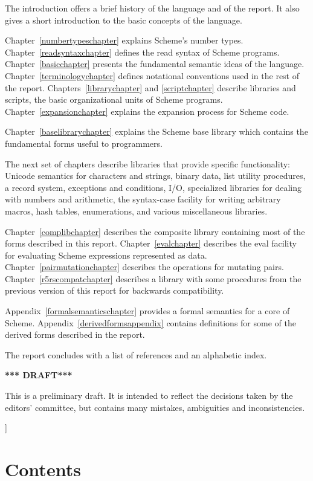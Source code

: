 {The introduction offers a brief history of the language and of
the report.  It also gives a short introduction to the basic concepts
of the language.

Chapter~\ref{numbertypeschapter} explains Scheme's number types.
Chapter~\ref{readsyntaxchapter} defines the read syntax of Scheme
programs.  Chapter~\ref{basicchapter} presents the fundamental
semantic ideas of the language.  Chapter~\ref{terminologychapter}
defines notational conventions used in the rest of the report.
Chapters~\ref{librarychapter} and \ref{scriptchapter} describe
libraries and scripts, the basic organizational units of Scheme
programs.  Chapter~\ref{expansionchapter} explains the expansion
process for Scheme code.

Chapter~\ref{baselibrarychapter} explains the Scheme base library which
contains the fundamental forms useful to programmers.

The next set of chapters describe libraries that provide specific
functionality:
Unicode semantics for characters and strings,
binary data,
list utility procedures,
a record system,
exceptions and conditions,
I/O,
specialized libraries for dealing with numbers and arithmetic,
the {\cf syntax-case} facility for writing arbitrary macros,
hash tables,
enumerations,
and various miscellaneous libraries.

Chapter~\ref{complibchapter} describes the composite library
containing most of the forms described in this report.
Chapter~\ref{evalchapter} describes the {\cf eval} facility for
evaluating Scheme expressions represented as data.
Chapter~\ref{pairmutationchapter} describes the operations for
mutating pairs.  Chapter~\ref{r5rscompatchapter} describes a library
with some procedures from the previous
version of this report for backwards compatibility.

Appendix~\ref{formalsemanticschapter} provides a formal semantics for a
core of Scheme.  Appendix~\ref{derivedformsappendix} contains
definitions for some of the derived forms described in the report.

\vest The report concludes with a list of references and an
alphabetic index.

\bigskip

\begin{center}
{\large \bf
*** DRAFT*** \\
}\end{center}

This is a preliminary draft.  It is intended to reflect the decisions
taken by the editors' committee, but contains many mistakes,
ambiguities and inconsistencies.

}]

\clearpage

\chapter*{Contents}
\addvspace{3.5pt}                  %
\renewcommand{\tocshrink}{-4.0pt}  %
{\footnotesize
\tableofcontents
}

\vfill
\eject

